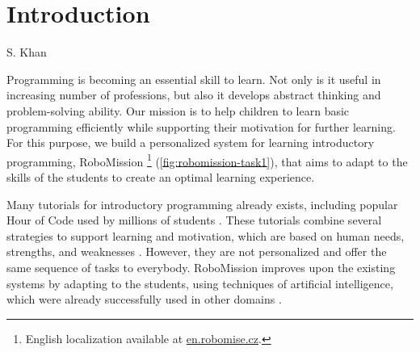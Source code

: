 \chapter{Introduction}
\label{chap:introduction}


{S. Khan}

Programming is becoming an essential skill to learn.
Not only is it useful in increasing number of professions,
but also it develops abstract thinking and problem-solving ability. %
Our mission is to help children to learn basic programming efficiently
while supporting their motivation for further learning.
For this purpose, we build a personalized system for learning introductory
programming, RoboMission%
\footnote{English localization available at \url{en.robomise.cz}.}
(\cref{fig:robomission-task1}),
that aims to adapt to the skills of the students
to create an optimal learning experience.

Many tutorials for introductory programming already exists,
including popular Hour of Code used by millions of students \cite{hour-of-code}.
These tutorials combine several strategies to support learning and motivation,
which are based on human needs, strengths, and weaknesses
\cite{lowering-barriers}.
However, they are not personalized and offer the same sequence of tasks
to everybody.
RoboMission improves upon the existing systems by adapting to the
students, using techniques of artificial intelligence,
which were already successfully used in other domains
\cite{mathsgarden, alg.evaluation-geography, matmat.response-times}.


